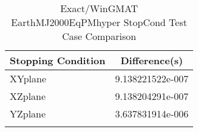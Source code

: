 \begin{table}[htbp!]
\centering
\caption{ Exact/WinGMAT EarthMJ2000EqPMhyper StopCond Test Case Comparison}
      \begin{tabular}{lc}
      \hline\hline
          Stopping Condition & Difference(s) \\
         \hline
         XYplane & 9.138221522e-007 \\
         XZplane & 9.138204291e-007 \\
         YZplane & 3.637831914e-006 \\
      \hline\hline
      \label{Table: Exact-WinGMAT EarthMJ2000EqPMhyper StopCond Table} 
\end{tabular}
\end{table}
